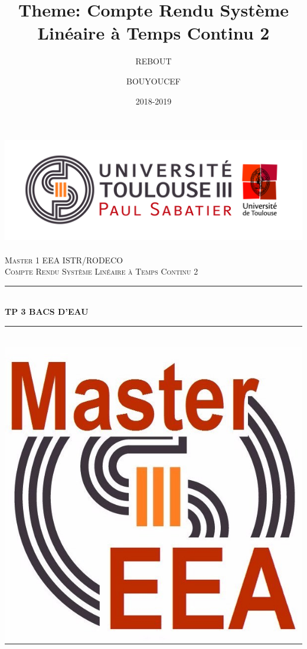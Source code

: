 \documentclass[12pt, a4paper, openany]{report}
\title{Theme: Compte Rendu Système Linéaire à Temps Continu 2}
\author{REBOUT \bsc{Mehenna}}
\author{BOUYOUCEF \bsc{Farid}}
\date{2018-2019}
\newcommand{\HRule}{\rule{\linewidth}{0.5mm}}
\begin{document}

\makeatletter
  \begin{titlepage}
  

  \begin{sffamily}
   \begin{center}

    \includegraphics[scale=0.5]{Logo_UT3.jpg}~\\[1.5cm]

    \textsc{\LARGE Master 1 EEA ISTR/RODECO  }\\[2cm]

    \textsc{\Large Compte Rendu  Système Linéaire à Temps Continu 2}\\[1.5cm]

    \HRule \\[0.4cm] %
    { \huge \bfseries TP 3 BACS D’EAU\\[0.4cm] }

    \HRule \\[1cm]   %
    \includegraphics[scale=0.1]{logomaster.jpg}
    \\[1cm]


\end{center}
\end{sffamily}
\end{titlepage}
\end{document}
